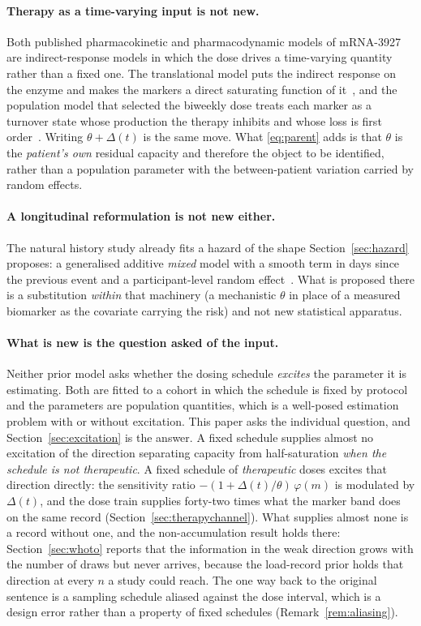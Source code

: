 \paragraph{Therapy as a time-varying input is not new.} Both published pharmacokinetic and
pharmacodynamic models of mRNA-3927 are indirect-response models in which the dose drives a
time-varying quantity rather than a fixed one. The translational model puts the indirect
response on the enzyme and makes the markers a direct saturating function of
it~\cite{pkpd_translational}, %
and the population model that selected the biweekly dose treats each marker as a turnover
state whose production the therapy inhibits and whose loss is first
order~\cite{dose_selection_poster}. Writing $\theta + \Delta(t)$ is the same move. What
\eqref{eq:parent} adds is that $\theta$ is the \emph{patient's own} residual capacity and
therefore the object to be identified, rather than a population parameter with the
between-patient variation carried by random effects.

\paragraph{A longitudinal reformulation is not new either.} The natural history study
already fits a hazard of the shape Section~\ref{sec:hazard} proposes: a generalised additive
\emph{mixed} model with a smooth term in days since the previous event and a
participant-level random effect~\cite{natural_history}. %
What is proposed there is a substitution \emph{within} that machinery (a mechanistic
$\theta$ in place of a measured biomarker as the covariate carrying the risk) and not
new statistical apparatus.

\paragraph{What is new is the question asked of the input.} Neither prior model asks whether
the dosing schedule \emph{excites} the parameter it is estimating. Both are fitted to a
cohort in which the schedule is fixed by protocol and the parameters are population
quantities, which is a well-posed estimation problem with or without excitation. This paper
asks the individual question, and Section~\ref{sec:excitation} is the answer. A fixed
schedule supplies almost no excitation of the direction separating capacity from
half-saturation \emph{when the schedule is not therapeutic}. A fixed schedule of
\emph{therapeutic} doses excites that direction directly: the sensitivity ratio
$-(1 + \Delta(t)/\theta)\,\varphi(m)$ is modulated by $\Delta(t)$, and the dose train
supplies forty-two times what the marker band does on the same record
(Section~\ref{sec:therapychannel}). What supplies almost none is a record without one, and
the non-accumulation result holds there: Section~\ref{sec:whoto} reports that the
information in the weak direction grows with the number of draws but never arrives, because
the load-record prior holds that direction at every $n$ a study could reach. The one way
back to the original sentence is a sampling schedule aliased against the dose interval,
which is a design error rather than a property of fixed schedules
(Remark~\ref{rem:aliasing}).

